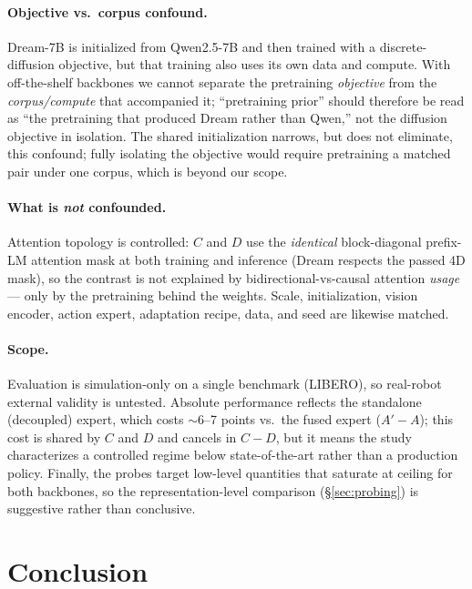 \documentclass{article}
\begin{document}
\paragraph{Objective vs.\ corpus confound.} Dream-7B is initialized from
Qwen2.5-7B and then trained with a discrete-diffusion objective, but that training
also uses its own data and compute. With off-the-shelf backbones we cannot
separate the pretraining \emph{objective} from the \emph{corpus/compute} that
accompanied it; ``pretraining prior'' should therefore be read as ``the
pretraining that produced Dream rather than Qwen,'' not the diffusion objective in
isolation. The shared initialization narrows, but does not eliminate, this
confound; fully isolating the objective would require pretraining a matched pair
under one corpus, which is beyond our scope.

\paragraph{What is \emph{not} confounded.} Attention topology is controlled: $C$
and $D$ use the \emph{identical} block-diagonal prefix-LM attention mask at both
training and inference (Dream respects the passed 4D mask), so the contrast is not
explained by bidirectional-vs-causal attention \emph{usage} --- only by the
pretraining behind the weights. Scale, initialization, vision encoder, action
expert, adaptation recipe, data, and seed are likewise matched.

\paragraph{Scope.} Evaluation is simulation-only on a single benchmark (LIBERO),
so real-robot external validity is untested. Absolute performance reflects the
standalone (decoupled) expert, which costs $\sim$6--7 points vs.\ the fused expert
($A'-A$); this cost is shared by $C$ and $D$ and cancels in $C-D$, but it means the
study characterizes a controlled regime below state-of-the-art rather than a
production policy. Finally, the probes target low-level quantities that saturate at
ceiling for both backbones, so the representation-level comparison
(\S\ref{sec:probing}) is suggestive rather than conclusive.

\section{Conclusion}
\end{document}
